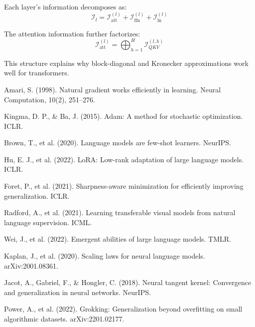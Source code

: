\documentclass[11pt]{article}
\begin{document}
Each layer's information decomposes as:
\begin{equation}
\mathcal{I}_l = \mathcal{I}_{\text{att}}^{(l)} + \mathcal{I}_{\text{ffn}}^{(l)} + \mathcal{I}_{\text{ln}}^{(l)}
\end{equation}

The attention information further factorizes:
\begin{equation}
\mathcal{I}_{\text{att}}^{(l)} = \bigoplus_{h=1}^H \mathcal{I}_{QKV}^{(l,h)}
\end{equation}

This structure explains why block-diagonal and Kronecker approximations work well for transformers.


\begin{thebibliography}{99}

Amari, S. (1998). Natural gradient works efficiently in learning. Neural Computation, 10(2), 251--276.

Kingma, D. P., \& Ba, J. (2015). Adam: A method for stochastic optimization. ICLR.

Brown, T., et al. (2020). Language models are few-shot learners. NeurIPS.

Hu, E. J., et al. (2022). LoRA: Low-rank adaptation of large language models. ICLR.

Foret, P., et al. (2021). Sharpness-aware minimization for efficiently improving generalization. ICLR.

Radford, A., et al. (2021). Learning transferable visual models from natural language supervision. ICML.

Wei, J., et al. (2022). Emergent abilities of large language models. TMLR.

Kaplan, J., et al. (2020). Scaling laws for neural language models. arXiv:2001.08361.

Jacot, A., Gabriel, F., \& Hongler, C. (2018). Neural tangent kernel: Convergence and generalization in neural networks. NeurIPS.

Power, A., et al. (2022). Grokking: Generalization beyond overfitting on small algorithmic datasets. arXiv:2201.02177.

\end{thebibliography}
\end{document}
